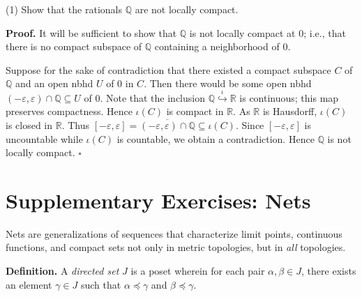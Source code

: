 \documentclass[a4paper]{article}
\newcommand{\R}{\mathbb{R}}
\newcommand{\Q}{\mathbb{Q}}
\begin{document}
(1) Show that the rationals $\Q$ are not locally compact.

\textbf{Proof.} It will be sufficient to show that $\Q$ is not locally compact at $0$; i.e., that there is no compact subspace of $\Q$ containing a neighborhood of $0$.

Suppose for the sake of contradiction that there existed a compact subspace $C$ of $\Q$ and an open nbhd $U$ of $0$ in $C$. Then there would be some open nbhd $(-\varepsilon, \varepsilon) \cap \Q \subseteq U$ of $0$. Note that the inclusion $\Q \overset{\iota}{\hookrightarrow} \R$ is continuous; this map preserves compactness. Hence $\iota(C)$ is compact in $\R$. As $\R$ is Hausdorff, $\iota(C)$ is closed in $\R$. Thus $[-\varepsilon, \varepsilon] = \overline{(-\varepsilon, \varepsilon) \cap \Q} \subseteq \iota(C)$. Since $[-\varepsilon, \varepsilon]$ is uncountable while $\iota(C)$ is countable, we obtain a contradiction. Hence $\Q$ is not locally compact. $\square$

\section*{Supplementary Exercises: Nets}

Nets are generalizations of sequences that characterize limit points, continuous functions, and compact sets not only in metric topologies, but in \emph{all} topologies.

\textbf{Definition.} A \emph{directed set} $J$ is a poset wherein for each pair $\alpha, \beta \in J$, there exists an element $\gamma \in J$ such that $\alpha \preceq \gamma$ and $\beta \preceq \gamma$.
\end{document}
